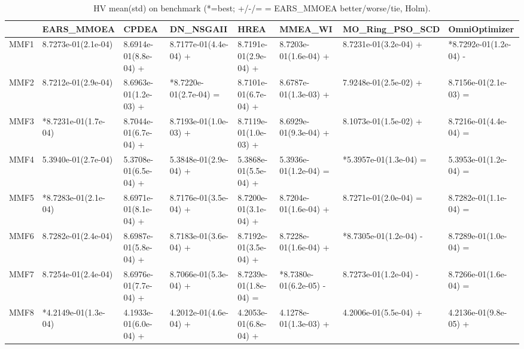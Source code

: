 \begin{table}[t]
\centering
\caption{HV mean(std) on benchmark (*=best; +/-/= = EARS_MMOEA better/worse/tie, Holm).}
\label{tab:benchmark_HV}
\begin{tabular}{llllllll}
\toprule
 & EARS\_MMOEA & CPDEA & DN\_NSGAII & HREA & MMEA\_WI & MO\_Ring\_PSO\_SCD & OmniOptimizer \\
\midrule
MMF1 & 8.7273e-01(2.1e-04) & 8.6914e-01(8.8e-04) + & 8.7177e-01(4.4e-04) + & 8.7191e-01(2.9e-04) + & 8.7203e-01(1.6e-04) + & 8.7231e-01(3.2e-04) + & *8.7292e-01(1.2e-04) - \\
MMF2 & 8.7212e-01(2.9e-04) & 8.6963e-01(1.2e-03) + & *8.7220e-01(2.7e-04) = & 8.7101e-01(6.7e-04) + & 8.6787e-01(1.3e-03) + & 7.9248e-01(2.5e-02) + & 8.7156e-01(2.1e-03) = \\
MMF3 & *8.7231e-01(1.7e-04) & 8.7044e-01(6.7e-04) + & 8.7193e-01(1.0e-03) + & 8.7119e-01(1.0e-03) + & 8.6929e-01(9.3e-04) + & 8.1073e-01(1.5e-02) + & 8.7216e-01(4.4e-04) = \\
MMF4 & 5.3940e-01(2.7e-04) & 5.3708e-01(6.5e-04) + & 5.3848e-01(2.9e-04) + & 5.3868e-01(5.5e-04) + & 5.3936e-01(1.2e-04) = & *5.3957e-01(1.3e-04) = & 5.3953e-01(1.2e-04) = \\
MMF5 & *8.7283e-01(2.1e-04) & 8.6971e-01(8.1e-04) + & 8.7176e-01(3.5e-04) + & 8.7200e-01(3.1e-04) + & 8.7204e-01(1.6e-04) + & 8.7271e-01(2.0e-04) = & 8.7282e-01(1.1e-04) = \\
MMF6 & 8.7282e-01(2.4e-04) & 8.6987e-01(5.8e-04) + & 8.7183e-01(3.6e-04) + & 8.7192e-01(3.5e-04) + & 8.7228e-01(1.6e-04) + & *8.7305e-01(1.2e-04) - & 8.7289e-01(1.0e-04) = \\
MMF7 & 8.7254e-01(2.4e-04) & 8.6976e-01(7.7e-04) + & 8.7066e-01(5.3e-04) + & 8.7239e-01(1.8e-04) = & *8.7380e-01(6.2e-05) - & 8.7273e-01(1.2e-04) - & 8.7266e-01(1.6e-04) = \\
MMF8 & *4.2149e-01(1.3e-04) & 4.1933e-01(6.0e-04) + & 4.2012e-01(4.6e-04) + & 4.2053e-01(6.8e-04) + & 4.1278e-01(1.3e-03) + & 4.2006e-01(5.5e-04) + & 4.2136e-01(9.8e-05) + \\
\bottomrule
\end{tabular}
\end{table}
